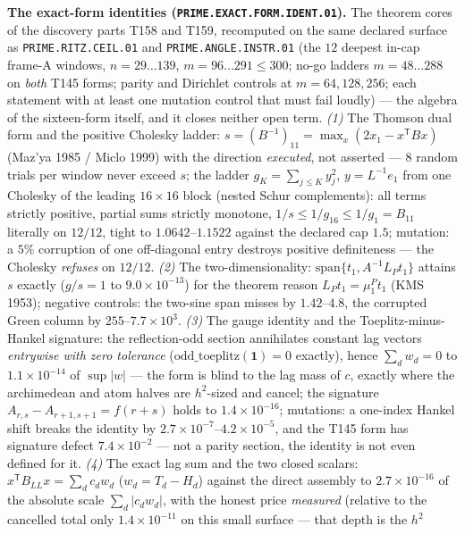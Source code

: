 \documentclass[11pt,a4paper]{article}
\begin{document}
\par\smallskip\noindent\textbf{The exact-form identities
(\texttt{PRIME.EXACT.FORM.IDENT.01}).}
The theorem cores of the discovery parts T158 and T159, recomputed on
the same declared surface as \texttt{PRIME.RITZ.CEIL.01} and
\texttt{PRIME.ANGLE.INSTR.01} (the $12$ deepest in-cap frame-A windows,
$n=29\ldots139$, $m=96\ldots291\le300$; no-go ladders $m=48\ldots288$ on
\emph{both} T145 forms; parity and Dirichlet controls at $m=64,128,256$;
each statement with at least one mutation control that must fail loudly)
--- the algebra of the sixteen-form itself, and it closes neither open
term. \emph{(1)} The Thomson dual form and the positive Cholesky
ladder: $s=(B^{-1})_{11}=\max_x(2x_1-x^{\mathsf T}Bx)$ (Maz'ya 1985 /
Miclo 1999) with the direction \emph{executed}, not asserted --- $8$
random trials per window never exceed $s$; the ladder
$g_K=\sum_{j\le K}y_j^2$, $y=L^{-1}e_1$ from one Cholesky of the leading
$16\times16$ block (nested Schur complements): all terms strictly
positive, partial sums strictly monotone, $1/s\le1/g_{16}\le1/g_1=
B_{11}$ literally on $12/12$, tight to $1.0642$--$1.1522$ against the
declared cap $1.5$; mutation: a $5\%$ corruption of one off-diagonal
entry destroys positive definiteness --- the Cholesky \emph{refuses} on
$12/12$. \emph{(2)} The two-dimensionality:
$\mathrm{span}\{t_1,A^{-1}L_Pt_1\}$ attains $s$ exactly ($g/s=1$ to
$9.0\times10^{-13}$) for the theorem reason $L_Pt_1=\mu^P_1t_1$ (KMS
1953); negative controls: the two-sine span misses by $1.42$--$4.8$, the
corrupted Green column by $255$--$7.7\times10^{3}$. \emph{(3)} The gauge
identity and the Toeplitz-minus-Hankel signature: the reflection-odd
section annihilates constant lag vectors \emph{entrywise with zero
tolerance} ($\mathrm{odd\_toeplitz}(\mathbf 1)=0$ exactly), hence
$\sum_dw_d=0$ to $1.1\times10^{-14}$ of $\sup|w|$ --- the form is blind
to the lag mass of $c$, exactly where the archimedean and atom halves
are $h^2$-sized and cancel; the signature $A_{r,s}-A_{r+1,s+1}=f(r+s)$
holds to $1.4\times10^{-16}$; mutations: a one-index Hankel shift breaks
the identity by $2.7\times10^{-7}$--$4.2\times10^{-5}$, and the T145
form has signature defect $7.4\times10^{-2}$ --- not a parity section,
the identity is not even defined for it. \emph{(4)} The exact lag sum
and the two closed scalars: $x^{\mathsf T}B_{LL}x=\sum_dc_dw_d$
($w_d=T_d-H_d$) against the direct assembly to $2.7\times10^{-16}$ of
the absolute scale $\sum_d|c_dw_d|$, with the honest price
\emph{measured} (relative to the cancelled total only
$1.4\times10^{-11}$ on this small surface --- that depth is the $h^2$
\end{document}
